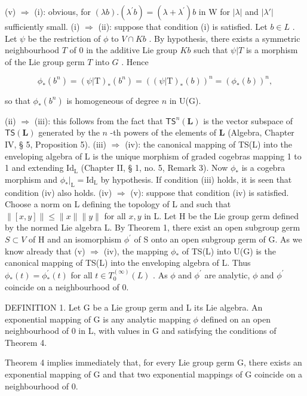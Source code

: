 (v) \(\Rightarrow\) (i): obvious, for \((\lambda b).(\lambda^{\prime}b) = (\lambda +\lambda^{\prime})b\) in W for \(|\lambda |\) and \(|\lambda '|\) sufficiently small.
(i) \(\Rightarrow\) (ii): suppose that condition (i) is satisfied. Let \(b \in L\) . Let \(\psi\) be the restriction of \(\phi\) to \(V \cap Kb\) . By hypothesis, there exists a symmetric neighbourhood \(T\) of 0 in the additive Lie group \(Kb\) such that \(\psi|T\) is a morphism of the Lie group germ \(T\) into \(G\) . Hence

\[
\phi_ {*} (b ^ {n}) = (\psi | \mathrm{T}) _ {*} (b ^ {n}) = ((\psi | \mathrm{T}) _ {*} (b)) ^ {n} = (\phi_ {*} (b)) ^ {n},
\]

so that \(\phi_{*}(b^{n})\) is homogeneous of degree \(n\) in U(G).

(ii) \(\Rightarrow\) (iii): this follows from the fact that \(\mathsf{TS}^n (\mathbf{L})\) is the vector subspace of \(\mathsf{TS}(\mathbf{L})\) generated by the \(n\) -th powers of the elements of \(\mathbf{L}\) (Algebra, Chapter IV, § 5, Proposition 5).
(iii) \(\Rightarrow\) (iv): the canonical mapping of TS(L) into the enveloping algebra of L is the unique morphism of graded cogebras mapping 1 to 1 and extending \(\mathrm{Id}_{\mathrm{L}}\) (Chapter II, § 1, no. 5, Remark 3). Now \(\phi_{*}\) is a cogebra morphism and \(\phi_{*}|_{\mathrm{L}} = \mathrm{Id}_{\mathrm{L}}\) by hypothesis. If condition (iii) holds, it is seen that condition (iv) also holds.
(iv) \(\Rightarrow\) (v): suppose that condition (iv) is satisfied. Choose a norm on L defining the topology of L and such that \(\| [x,y]\| \leqslant \| x\| \| y\|\) for all \(x,y\) in L. Let H be the Lie group germ defined by the normed Lie algebra L. By Theorem 1, there exist an open subgroup germ \(S\subset V\) of H and an isomorphism \(\phi^{\prime}\) of S onto an open subgroup germ of G. As we know already that (v) \(\Rightarrow\) (iv), the mapping \(\phi_{*}\) of TS(L) into U(G) is the canonical mapping of TS(L) into the enveloping algebra of L. Thus \(\phi_{*}(t) = \phi_{*}^{\prime}(t)\) for all \(t\in T_0^{(\infty)}(L)\) . As \(\phi\) and \(\phi^{\prime}\) are analytic, \(\phi\) and \(\phi^{\prime}\) coincide on a neighbourhood of 0.

DEFINITION 1. Let G be a Lie group germ and L its Lie algebra. An exponential mapping of G is any analytic mapping \(\phi\) defined on an open neighbourhood of 0 in L, with values in G and satisfying the conditions of Theorem 4.

Theorem 4 implies immediately that, for every Lie group germ G, there exists an exponential mapping of G and that two exponential mappings of G coincide on a neighbourhood of 0.

